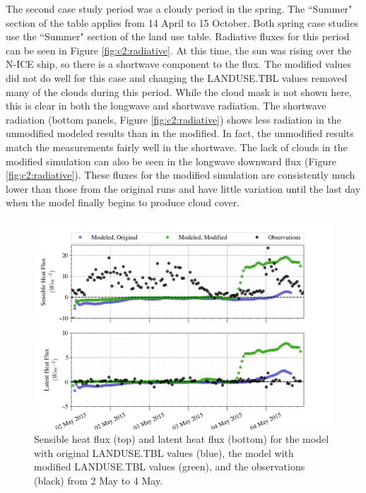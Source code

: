 The second case study period was a cloudy period in the spring. The ``Summer" section of the table applies from 14 April to 15 October. Both spring case studies use the ``Summer" section of the land use table. Radiative fluxes for this period can be seen in Figure \ref{fig:c2:radiative}. At this time, the sun was rising over the N-ICE ship, so there is a shortwave component to the flux. The modified values did not do well for this case and changing the LANDUSE.TBL values removed many of the clouds during this period. While the cloud mask is not shown here, this is clear in both the longwave and shortwave radiation. The shortwave radiation (bottom panels, Figure \ref{fig:c2:radiative}) shows less radiation in the unmodified modeled results than in the modified. In fact, the unmodified results match the measurements fairly well in the shortwave. The lack of clouds in the modified simulation can also be seen in the longwave downward flux (Figure \ref{fig:c2:radiative}). These fluxes for the modified simulation are consistently much lower than those from the original runs and have little variation until the last day when the model finally begins to produce cloud cover. 

\begin{figure}[t]
    \centering
    \includegraphics[width=1\linewidth]{figures/chapter6/case2_sensible_latent.png}
    \caption[Idealized Case 2 - Latent and sensible heat fluxes.]{Sensible heat flux (top) and latent heat flux (bottom) for the model with original LANDUSE.TBL values (blue), the model with modified LANDUSE.TBL values (green), and the observations (black) from 2 May to 4 May.}
    \label{fig:c2:heat}
\end{figure}

